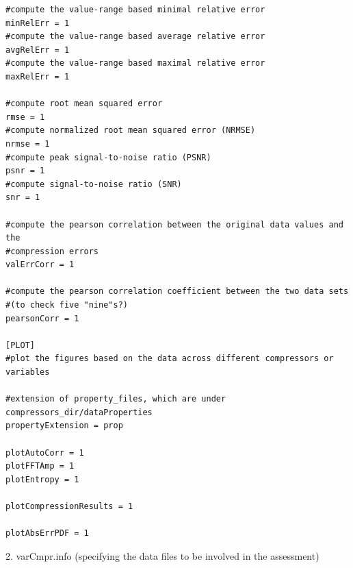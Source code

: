 \begin{lstlisting}[style=ShellStyleInline, basicstyle =\footnotesize\ttfamily]
#compute the value-range based minimal relative error
minRelErr = 1
#compute the value-range based average relative error
avgRelErr = 1
#compute the value-range based maximal relative error
maxRelErr = 1

#compute root mean squared error
rmse = 1
#compute normalized root mean squared error (NRMSE)
nrmse = 1
#compute peak signal-to-noise ratio (PSNR)
psnr = 1
#compute signal-to-noise ratio (SNR)
snr = 1

#compute the pearson correlation between the original data values and the
#compression errors
valErrCorr = 1

#compute the pearson correlation coefficient between the two data sets
#(to check five "nine"s?)
pearsonCorr = 1

[PLOT]
#plot the figures based on the data across different compressors or variables

#extension of property_files, which are under compressors_dir/dataProperties
propertyExtension = prop

plotAutoCorr = 1
plotFFTAmp = 1
plotEntropy = 1

plotCompressionResults = 1

plotAbsErrPDF = 1
\end{lstlisting}

2. varCmpr.info (specifying the data files to be involved in the assessment)

